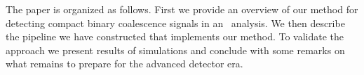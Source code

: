 The paper is organized as follows. First we provide an overview of our method
for detecting compact binary coalescence signals in an \earlywarning\ analysis.
We then describe the pipeline we have constructed that implements our method.
To validate the approach we present results of simulations and conclude with
some remarks on what remains to prepare for the advanced detector era.

